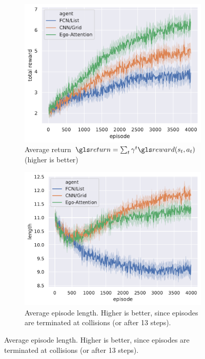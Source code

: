 \begin{figure}[htp]
	\centering
	\begin{subfigure}[t]{0.6\linewidth}
		\includegraphics[width=\linewidth]{img/total_reward}
		\caption{Average return $\return=\sum_t\gamma^t\R(s_t,a_t)$ (higher is better)}
		\label{fig:attention-reward}
	\end{subfigure}
	\begin{subfigure}[t]{0.49\linewidth}
		\includegraphics[width=\linewidth]{img/length}
		\caption{Average episode length. Higher is better, since episodes are terminated at collisions (or after 13 steps).}
		\label{fig:attention-length}
	\end{subfigure}

\end{figure}
